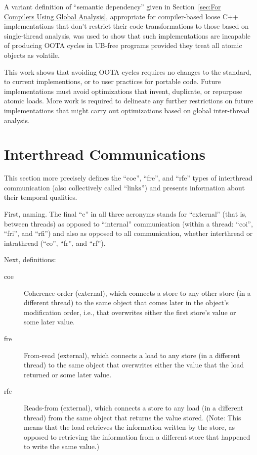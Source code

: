 \documentclass[10]{article}
\begin{document}
A variant definition of ``semantic dependency'' given in
Section~\ref{sec:For Compilers Using Global Analysis}, appropriate for
compiler-based loose C++ implementations that don't restrict
their code transformations to those based on single-thread analysis,
was used to show that such implementations
are incapable of producing OOTA cycles in UB-free programs
provided they treat all atomic objects as volatile.

This work shows that avoiding OOTA cycles requires no changes to the
standard, to current implementions, or to user practices for portable
code.
Future implementations must avoid optimizations that invent, duplicate,
or repurpose atomic loads.
More work is required to delineate any further restrictions on future
implementations that might carry out optimizations based on global
inter-thread analysis.

\clearpage
\appendix

\section{Interthread Communications}
\label{app:Interthread Communications}

This section more precisely defines the ``coe'', ``fre'', and ``rfe''
types of interthread communication (also collectively called ``links'')
and presents information about their temporal qualities.

First, naming.
The final ``e'' in all three acronyms stands for ``external'' (that
is, between threads) as opposed to ``internal'' communication (within
a thread: ``coi'', ``fri'', and ``rfi'') and also as opposed to all
communication, whether interthread or intrathread (``co'', ``fr'', and
``rf'').

Next, definitions:
\begin{description}
\item[coe]
	Coherence-order (external), which connects a store to any other store
	(in a different thread)
	to the same object that comes later in the object's
	modification order, i.e., that overwrites either the first store's
	value or some later value.
\item[fre]
	From-read (external), which connects a load to any store
	(in a different thread) to
	the same object that overwrites either the value that the load
	returned or some later value.
\item[rfe]
	Reads-from (external), which connects a store to any load
	(in a different thread) from
	the same object that returns the value stored.
	(Note: This means that the load retrieves the information
	written by the store, as opposed to retrieving the information
	from a different store that happened to write the same value.)
\end{description}
\end{document}
